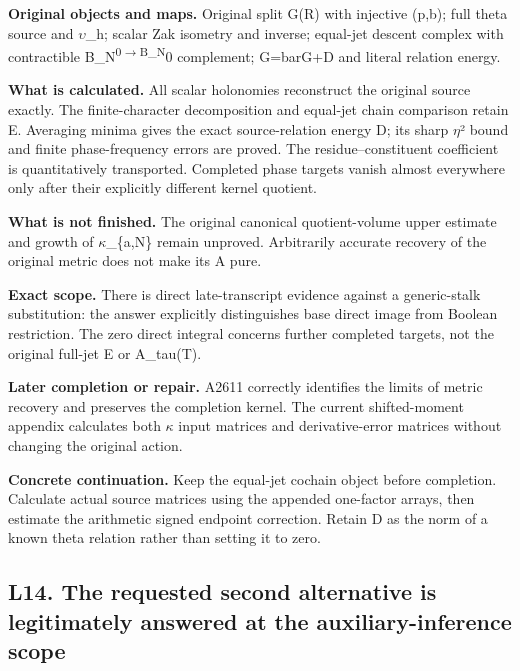 \textbf{Original objects and maps.} Original split G(R) with injective
(p,b); full theta source and
\allowbreak{}\ensuremath{υ}\allowbreak{}\_h; scalar Zak isometry and
inverse; equal-jet descent complex with contractible
B\_N\textsuperscript{0\allowbreak{}\ensuremath{→}\allowbreak{}B\_N}0
complement; G=barG+D and literal relation energy.

\textbf{What is calculated.} All scalar holonomies reconstruct the
original source exactly. The finite-character decomposition and
equal-jet chain comparison retain E. Averaging minima gives the exact
source-relation energy D; its sharp
\allowbreak{}\ensuremath{η}\allowbreak{}² bound and finite
phase-frequency errors are proved. The residue--constituent coefficient
is quantitatively transported. Completed phase targets vanish almost
everywhere only after their explicitly different kernel quotient.

\textbf{What is not finished.} The original canonical quotient-volume
upper estimate and growth of
\allowbreak{}\ensuremath{κ}\allowbreak{}\_\{a,N\} remain unproved.
Arbitrarily accurate recovery of the original metric does not make its A
pure.

\textbf{Exact scope.} There is direct late-transcript evidence against a
generic-stalk substitution: the answer explicitly distinguishes base
direct image from Boolean restriction. The zero direct integral concerns
further completed targets, not the original full-jet E or A\_tau(T).

\textbf{Later completion or repair.} A2611 correctly identifies the
limits of metric recovery and preserves the completion kernel. The
current shifted-moment appendix calculates both
\allowbreak{}\ensuremath{κ}\allowbreak{} input matrices and
derivative-error matrices without changing the original action.

\textbf{Concrete continuation.} Keep the equal-jet cochain object before
completion. Calculate actual source matrices using the appended
one-factor arrays, then estimate the arithmetic signed endpoint
correction. Retain D as the norm of a known theta relation rather than
setting it to zero.

\subsection{L14. The requested second alternative is legitimately
answered at the auxiliary-inference
scope}\label{TranscriptLedgerStage:l14.-the-requested-second-alternative-is-legitimately-answered-at-the-auxiliary-inference-scope}

